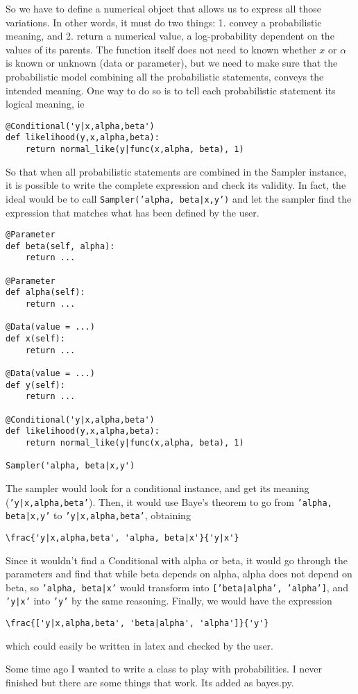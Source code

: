 \documentclass{article}
\begin{document}
So we have to define a numerical object that allows us to express all those variations. In other words, it must do two things: 1. convey a probabilistic meaning, and 2. return a numerical value, a log-probability dependent on the values of its parents. The function itself does not need to known whether $x$ or $\alpha $ is known or unknown (data or parameter), but we need to make sure that the probabilistic model combining all the probabilistic statements, conveys the intended meaning. One way to do so is to tell each probabilistic statement its logical meaning, ie
\begin{verbatim}
@Conditional('y|x,alpha,beta')
def likelihood(y,x,alpha,beta):
    return normal_like(y|func(x,alpha, beta), 1)
\end{verbatim}
So that when all probabilistic statements are combined in the Sampler instance, it is possible to write the complete expression and check its validity. In fact, the ideal would be to call
\texttt{Sampler('alpha, beta|x,y')} and let the sampler find the expression that matches what has been defined by the user.

\begin{verbatim}
@Parameter
def beta(self, alpha):
    return ...

@Parameter
def alpha(self):
    return ...

@Data(value = ...)
def x(self):
    return ...

@Data(value = ...)
def y(self):
    return ...

@Conditional('y|x,alpha,beta')
def likelihood(y,x,alpha,beta):
    return normal_like(y|func(x,alpha, beta), 1)

Sampler('alpha, beta|x,y')
\end{verbatim}
The sampler would look for a conditional instance, and get its meaning (\texttt{'y|x,alpha,beta'}). Then, it would use Baye's theorem to go from \texttt{'alpha, beta|x,y'} to \texttt{'y|x,alpha,beta'}, obtaining
\begin{verbatim}\frac{'y|x,alpha,beta', 'alpha, beta|x'}{'y|x'}\end{verbatim}
Since it wouldn't find a Conditional with alpha or beta, it would go through the parameters and find that while beta depends on alpha, alpha does not depend on beta, so \texttt{'alpha, beta|x'} would transform into \texttt{['beta|alpha', 'alpha']}, and \texttt{'y|x'} into \texttt{'y'} by the same reasoning. Finally, we would have the expression
\begin{verbatim}\frac{['y|x,alpha,beta', 'beta|alpha', 'alpha']}{'y'}\end{verbatim} which could easily be written in latex and checked by the user.

Some time ago I wanted to write a class to play with probabilities. I never finished but there are some things that work. Its added as bayes.py. 
\end{document}

